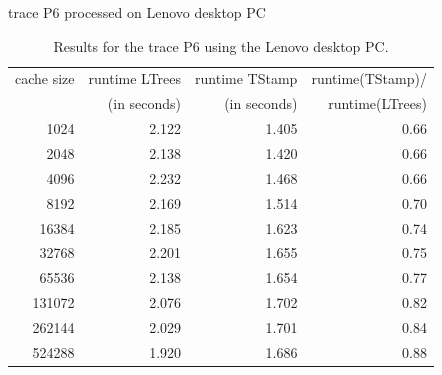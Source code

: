 \documentclass[a4paper,12pt, titlepage]{article}  %
\begin{document}
\begin{table}[p]
\begin{center}
	trace P6 processed on Lenovo desktop PC
	\begin{tabular}{|r||r|r|r|}
	  	\hline
                cache size                               &     runtime LTrees         &      runtime TStamp          &  runtime(TStamp)/ \\
                                                             &      (in seconds)            &      (in seconds)                 & runtime(LTrees)     \\
                \hline
                1024					     &         2.122                  &           1.405                      &        0.66               \\
		2048					     &         2.138                  &           1.420                        &        0.66                \\								
		4096					     &         2.232                  &           1.468                         &     0.66                   \\	
		8192					     &         2.169                  &           1.514                         &     0.70                   \\	
		16384				     &        2.185                   &           1.623                         &     0.74                   \\	
		32768				     &        2.201                   &            1.655                        &     0.75                    \\	
		65536				     &        2.138                  &            1.654                        &      0.77                   \\	
		131072				     &        2.076                      &        1.702                            &  0.82                       \\	
		262144				     &        2.029                      &        1.701                            &  0.84                       \\	
		524288				     &        1.920                      &          1.686                          &    0.88                     \\
                \hline
	\end{tabular}
	\caption{Results for the trace P6 using the Lenovo desktop PC.}
        \label{tab:lenovo_P6}
\end{center}
\end{table}
\end{document}
